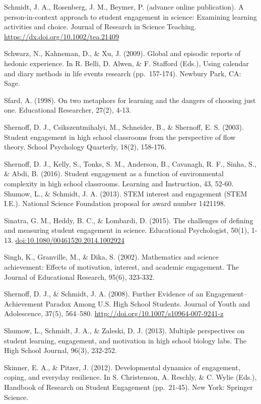 \documentclass[]{book}
\theoremstyle{definition}
\theoremstyle{definition}
\theoremstyle{definition}
\theoremstyle{remark}
\begin{document}
Schmidt, J. A., Rosenberg, J. M., Beymer, P. (advance online
publication). A person-in-context approach to student engagement in
science: Examining learning activities and choice. Journal of Research
in Science Teaching. \url{https://dx.doi.org/10.1002/tea.21409}

Schwarz, N., Kahneman, D., \& Xu, J. (2009). Global and episodic reports
of hedonic experience. In R. Belli, D. Alwen, \& F. Stafford (Eds.),
Using calendar and diary methods in life events research (pp.~157-174).
Newbury Park, CA: Sage.

Sfard, A. (1998). On two metaphors for learning and the dangers of
choosing just one. Educational Researcher, 27(2), 4-13.

Shernoff, D. J., Csikszentmihalyi, M., Schneider, B., \& Shernoff, E. S.
(2003). Student engagement in high school classrooms from the
perspective of flow theory. School Psychology Quarterly, 18(2), 158-176.

Shernoff, D. J., Kelly, S., Tonks, S. M., Anderson, B., Cavanagh, R. F.,
Sinha, S., \& Abdi, B. (2016). Student engagement as a function of
environmental complexity in high school classrooms. Learning and
Instruction, 43, 52-60.\\
Shumow, L., \& Schmidt, J. A. (2013). STEM interest and engagement (STEM
I.E.). National Science Foundation proposal for award number 1421198.

Sinatra, G. M., Heddy, B. C., \& Lombardi, D. (2015). The challenges of
defining and measuring student engagement in science. Educational
Psychologist, 50(1), 1-13. \url{doi:10.1080/00461520.2014.1002924}

Singh, K., Granville, M., \& Dika, S. (2002). Mathematics and science
achievement: Effects of motivation, interest, and academic engagement.
The Journal of Educational Research, 95(6), 323-332.

Shernoff, D. J., \& Schmidt, J. A. (2008). Further Evidence of an
Engagement--Achievement Paradox Among U.S. High School Students. Journal
of Youth and Adolescence, 37(5), 564--580.
\url{http://doi.org/10.1007/s10964-007-9241-z}

Shumow, L., Schmidt, J. A., \& Zaleski, D. J. (2013). Multiple
perspectives on student learning, engagement, and motivation in high
school biology labs. The High School Journal, 96(3), 232-252.

Skinner, E. A., \& Pitzer, J. (2012). Developmental dynamics of
engagement, coping, and everyday resilience. In S. Christenson, A.
Reschly, \& C. Wylie (Eds.), Handbook of Research on Student Engagement
(pp.~21-45). New York: Springer Science.
\end{document}
